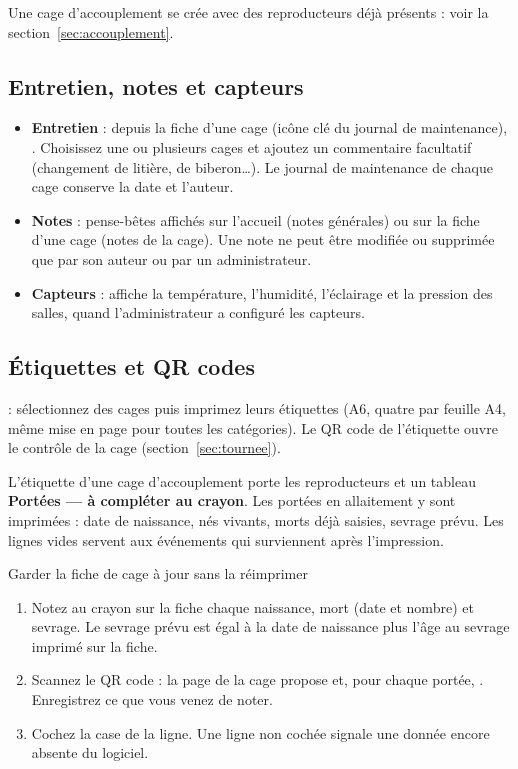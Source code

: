 \documentclass[11pt,a4paper]{article}
\begin{document}
Une cage d'accouplement se crée avec des reproducteurs déjà présents :
voir la section~\ref{sec:accouplement}.

\subsection{Entretien, notes et capteurs}
\begin{itemize}
  \item \textbf{Entretien} : depuis la fiche d'une cage (icône clé du journal
    de maintenance), . Choisissez une ou
    plusieurs cages et ajoutez un commentaire facultatif (changement de
    litière, de biberon\ldots). Le journal de maintenance de chaque cage
    conserve la date et l'auteur.
  \item \textbf{Notes} : pense-bêtes affichés sur l'accueil (notes générales)
    ou sur la fiche d'une cage (notes de la cage). Une note ne peut être
    modifiée ou supprimée que par son auteur ou par un administrateur.
  \item \textbf{Capteurs} :  affiche la
    température, l'humidité, l'éclairage et la pression des salles, quand
    l'administrateur a configuré les capteurs.
\end{itemize}

\subsection{Étiquettes et QR codes}\label{sec:etiquettes}
 : sélectionnez des cages puis imprimez leurs
étiquettes (A6, quatre par feuille A4, même mise en page pour toutes les
catégories). Le QR code de l'étiquette ouvre le contrôle de la cage
(section~\ref{sec:tournee}).

L'étiquette d'une cage d'accouplement porte les reproducteurs et un tableau
\textbf{Portées --- à compléter au crayon}. Les portées en allaitement y sont
imprimées : date de naissance, nés vivants, morts déjà saisies, sevrage
prévu. Les lignes vides servent aux événements qui surviennent après
l'impression.
\begin{procedure}{Garder la fiche de cage à jour sans la réimprimer}
\begin{enumerate}
  \item Notez au crayon sur la fiche chaque naissance, mort (date et nombre)
    et sevrage. Le sevrage prévu est égal à la date de naissance plus l'âge
    au sevrage imprimé sur la fiche.
  \item Scannez le QR code : la page de la cage propose  et, pour chaque portée, . Enregistrez ce
    que vous venez de noter.
  \item Cochez la case  de la ligne. Une ligne non cochée signale
    une donnée encore absente du logiciel.
\end{enumerate}
\end{procedure}
\end{document}
